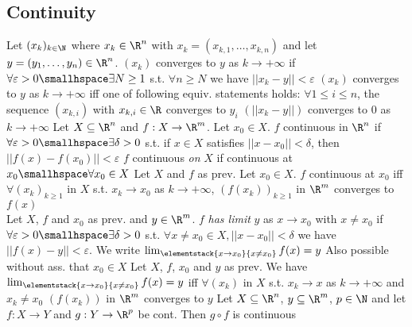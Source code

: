 \subsection{Continuity}
 Let $(x_k)_{k \in \N}$ where $x_k \in \R^n$ with $x_k = (x_{k, 1}, \ldots, x_{k, n})$ and let $y = (y_1, \ldots, y_n) \in \R^n$.
$(x_k)$ converges to $y$ as $k \rightarrow +\infty$ if $\forall \varepsilon > 0 \smallhspace \exists N \geq 1$ s.t. $\forall n \geq N$ we have $||x_k - y|| < \varepsilon$
\shortlemma $(x_k)$ converges to $y$ as $k \rightarrow +\infty$ iff one of following equiv. statements holds:
 $\forall 1 \leq i \leq n$, the sequence $(x_{k, i})$ with $x_{k, i} \in \R$ converges to $y_i$
 $(||x_k - y||)$ converges to $0$ as $k \rightarrow +\infty$
 Let $X \subseteq \R^n$ and $f: X \rightarrow \R^m$.
 Let $x_0 \in X$. $f$ continuous in $\R^n$ if $\forall \varepsilon > 0 \smallhspace \exists \delta > 0$ s.t. if $x \in X$ satisfies $||x - x_0|| < \delta$,
then $||f(x) - f(x_0)|| < \varepsilon$
 $f$ continuous \textit{on} $X$ if continuous at $x_0 \smallhspace \forall x_0 \in X$
\shortproposition Let $X$ and $f$ as prev. Let $x_0 \in X$. $f$ continuous at $x_0$ iff $\forall (x_k)_{k \geq 1}$ in $X$ s.t.
$x_k \rightarrow x_0$ as $k \rightarrow +\infty$, $(f(x_k))_{k \geq 1}$ in $\R^m$ converges to $f(x)$\\
 Let $X$, $f$ and $x_0$ as prev. and $y \in \R^m$. $f$ \textit{has limit} $y$ as $x \rightarrow x_0$ with $x \neq x_0$ if
$\forall \varepsilon > 0 \smallhspace \exists \delta > 0$ s.t. $\forall x \neq x_0 \in X, ||x - x_0|| < \delta$ we have $||f(x) - y|| < \varepsilon$.
We write $\lim_{\elementstack{x \rightarrow x_0}{x \neq x_0}} f(x) = y$
\shortremark Also possible without ass. that $x_0 \in X$
\shortproposition Let $X$, $f$, $x_0$ and $y$ as prev. We have $\lim_{\elementstack{x \rightarrow x_0}{x \neq x_0}} f(x) = y$
iff $\forall (x_k)$ in $X$ s.t. $x_k \rightarrow x$ as $k \rightarrow +\infty$ and $x_k \neq x_0$ $(f(x_k))$ in $\R^m$ converges to $y$
\shortproposition Let $X \subseteq \R^n$, $y \subseteq \R^m$, $p \in \N$ and let $f: X \rightarrow Y$ and $g: Y \rightarrow \R^p$ be cont. Then $g \circ f$ is continuous

